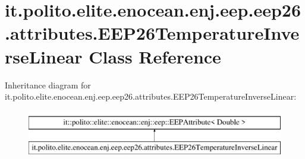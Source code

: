 \hypertarget{classit_1_1polito_1_1elite_1_1enocean_1_1enj_1_1eep_1_1eep26_1_1attributes_1_1_e_e_p26_temperature_inverse_linear}{}\section{it.\+polito.\+elite.\+enocean.\+enj.\+eep.\+eep26.\+attributes.\+E\+E\+P26\+Temperature\+Inverse\+Linear Class Reference}
\label{classit_1_1polito_1_1elite_1_1enocean_1_1enj_1_1eep_1_1eep26_1_1attributes_1_1_e_e_p26_temperature_inverse_linear}
Inheritance diagram for it.\+polito.\+elite.\+enocean.\+enj.\+eep.\+eep26.\+attributes.\+E\+E\+P26\+Temperature\+Inverse\+Linear\+:\begin{figure}[H]
\begin{center}
\leavevmode
\includegraphics[height=2.000000cm]{classit_1_1polito_1_1elite_1_1enocean_1_1enj_1_1eep_1_1eep26_1_1attributes_1_1_e_e_p26_temperature_inverse_linear}
\end{center}
\end{figure}
